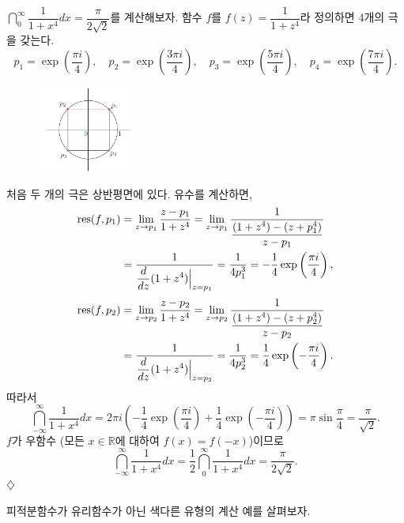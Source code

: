 \begin{salt_example}\label{example-4-19}
$\dint_0^ \infty \dfrac1{1+x^4}dx = \dfrac{\pi}{2\sqrt{2}}$를 계산해보자.
함수 $f$를  $f(z) = \dfrac1{1+z^4}$라 정의하면 $4$개의 극을 갖는다.
\[
p_1 = \exp\left(\dfrac{\pi i}4\right), \quad
p_2 = \exp\left(\dfrac{3\pi i}4\right), \quad
p_3 = \exp\left(\dfrac{5\pi i}4\right), \quad
p_4 = \exp\left(\dfrac{7\pi i}4\right).
\]
\begin{figure}[h!]
\begin{center}
\includegraphics[width=0.3\textwidth]{./SaltChapter/fig-4-0-12}
\end{center}
\end{figure}
\end{salt_example}
처음 두 개의 극은 상반평면에 있다. 유수를 계산하면,
\begin{align*}
\mathop{\mathrm{res}}(f,p_1) &= \lim_{z\to p_1} \displaystyle\frac{z-p_1}{1+z^4} 
= \lim_{z\to p_1} \displaystyle\frac1{\displaystyle\frac{(1+z^4) - (z+p_1^4)}{z-p_1}} \\
&= \displaystyle\frac1{\displaystyle\frac{d}{dz}(1+z^4)\Big|_{z=p_1}} = \displaystyle\frac1{4p_1^3}
= - \displaystyle\frac14 \exp\left(\displaystyle\frac{\pi i}4\right),
\end{align*}
\begin{align*}
\mathop{\mathrm{res}}(f,p_2) &= \lim_{z\to p_2} \displaystyle\frac{z-p_2}{1+z^4} 
= \lim_{z\to p_2} \displaystyle\frac1{\displaystyle\frac{(1+z^4) - (z+p_2^4)}{z-p_2}} \\
&= \displaystyle\frac1{\displaystyle\frac{d}{dz}(1+z^4)\Big|_{z=p_2}} = \displaystyle\frac1{4p_2^3}
= \displaystyle\frac14 \exp\left(-\displaystyle\frac{\pi i}4\right).
\end{align*}
따라서
\[
\dint_{-\infty}^ \infty \dfrac1{1+x^4}dx
= 2\pi i \left( - \dfrac14 \exp\left(\dfrac{\pi i}4\right)
+ \dfrac14 \exp\left(-\dfrac{\pi i}4\right) \right)
= \pi \sin \dfrac\pi 4 = \dfrac\pi{\sqrt{2}}.
\]
$f$가 우함수 (모든 $x\in\mathbb R$에 대하여 $f(x)=f(-x)$)이므로
\[
\dint_{-\infty}^ \infty \dfrac1{1+x^4}dx = \dfrac12 
\dint_0^ \infty \dfrac1{1+x^4}dx = \dfrac{\pi}{2\sqrt{2}}.
\]
\hfill $\diamondsuit$

피적분함수가 유리함수가 아닌 색다른  유형의 계산 예를 살펴보자.


